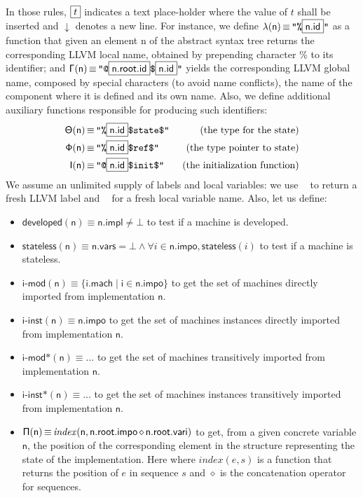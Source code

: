 \documentclass{llncs}
\newcommand{\nl}[0]{\ensuremath{\downarrow}}
\DeclareMathOperator{\conc}{\diamond}
\DeclareMathOperator{\isdef}{\equiv}
\DeclareMathOperator{\lbl}{\mathcal{L}()}
\DeclareMathOperator{\variable}{\mathcal{V}()}
\newcommand{\llvm}[1]{\texttt{#1}}
\newcommand{\B}[1]{\textsf{#1}}
\newcommand{\PH}[1]{\framebox{$#1$}}
\newcommand{\Global}[0]{\ensuremath{\sf\Gamma}}
\newcommand{\local}[0]{\ensuremath{\sf\lambda}}
\newcommand{\developed}[0]{\ensuremath{\textsf{developed}}}
\newcommand{\stateless}[0]{\ensuremath{\textsf{stateless}}}
\newcommand{\importedmodules}[0]{\ensuremath{\textsf{i-mod}}}
\newcommand{\trimportedmodules}[0]{\ensuremath{\textsf{i-mod$\mathsf{\ast}$}}}
\newcommand{\importedinstances}[0]{\ensuremath{\textsf{i-inst}}}
\newcommand{\trimportedinstances}[0]{\ensuremath{\textsf{i-inst$\mathsf{\ast}$}}}
\newcommand{\idx}[0]{\ensuremath{\sf\Pi}}
\newcommand{\state}[0]{\ensuremath{\sf\Theta}}
\newcommand{\stateref}[0]{\ensuremath{\sf\Phi}}
\newcommand{\init}[0]{\ensuremath{\mathsf{I}}}
\begin{document}
In those rules, $\PH{t}$ indicates a text place-holder where the value of $t$
shall be inserted and $\nl$ denotes a new line. For instance, we define
$\local(\B{n}) \isdef \llvm{"\%\PH{\B{n.id}}"}$ as a function that given an
element \B{n} of the abstract syntax tree returns the corresponding LLVM local
name, obtained by prepending character \% to its identifier; and $\Global(\B{n})
\isdef \llvm{"@\PH{\B{n.root.id}}\$\PH{\B{n.id}}"}$ yields the corresponding
LLVM global name, composed by special characters (to avoid name conflicts), the
name of the component where it is defined and its own name.  Also, we define
additional auxiliary functions responsible for producing such identifiers:
\begin{align*}
\state(\B{n}) & \isdef \llvm{"\%\PH{\B{n.id}}\$state\$"} & \text{ (the type for the state)} \\
\stateref(\B{n}) & \isdef \llvm{"\%\PH{\B{n.id}}\$ref\$"} & \text{ (the type pointer to state)} \\
\init(\B{n}) & \isdef \llvm{"@\PH{\B{n.id}}\$init\$"} & \text{ (the initialization function)}
\end{align*}
We assume an unlimited supply of labels and local variables: we use $\lbl$ to
return a fresh LLVM label and $\variable$ for a fresh local variable name. Also, let us define:
\begin{itemize}
\item $\developed(\B{n}) \isdef \B{n.impl} \neq \bot$ to test if a machine is
  developed.
\item $\stateless(\B{n}) \isdef \B{n.vars} =  \bot \land \forall i \in \B{n.impo}, \stateless(i)$ to test if a machine is stateless.
\item $\importedmodules(\B{n}) \isdef \{ \B{i.mach} \mid \B{i} \in \B{n.impo}
  \}$ to get the set of machines directly imported from implementation $\B{n}$.
\item $\importedinstances(\B{n}) \isdef \B{n.impo}$ to get the set of machines
  instances directly imported from implementation $\B{n}$.
\item $\trimportedmodules(\B{n}) \isdef \ldots$ to get the set of machines
transitively imported from implementation $\B{n}$.
\item $\trimportedinstances(\B{n}) \isdef \ldots$ to get the set of machines
instances transitively imported from implementation $\B{n}$.
\item $\idx(\B{n}) \isdef \mathit{index}(\B{n}, \B{n.root.impo} \conc
  \B{n.root.vari})$ to get, from a given concrete variable $\B{n}$, the position
  of the corresponding element in the structure representing the state of the
  implementation. Here where $\mathit{index}(e, s)$ is a function that returns
  the position of $e$ in sequence $s$ and $\conc$ is the concatenation operator
  for sequences.
\end{itemize}
\end{document}
